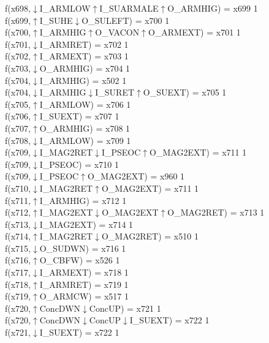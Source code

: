 f(x698,$\downarrow$I\_ARMLOW$\uparrow$I\_SUARMALE$\uparrow$O\_ARMHIG) = x699 {1} \\
f(x699,$\uparrow$I\_SUHE$\downarrow$O\_SULEFT) = x700 {1} \\
f(x700,$\uparrow$I\_ARMHIG$\uparrow$O\_VACON$\uparrow$O\_ARMEXT) = x701 {1} \\
f(x701,$\downarrow$I\_ARMRET) = x702 {1} \\
f(x702,$\uparrow$I\_ARMEXT) = x703 {1} \\
f(x703,$\downarrow$O\_ARMHIG) = x704 {1} \\
f(x704,$\downarrow$I\_ARMHIG) = x502 {1} \\
f(x704,$\downarrow$I\_ARMHIG$\downarrow$I\_SURET$\uparrow$O\_SUEXT) = x705 {1} \\
f(x705,$\uparrow$I\_ARMLOW) = x706 {1} \\
f(x706,$\uparrow$I\_SUEXT) = x707 {1} \\
f(x707,$\uparrow$O\_ARMHIG) = x708 {1} \\
f(x708,$\downarrow$I\_ARMLOW) = x709 {1} \\
f(x709,$\downarrow$I\_MAG2RET$\downarrow$I\_PSEOC$\uparrow$O\_MAG2EXT) = x711 {1} \\
f(x709,$\downarrow$I\_PSEOC) = x710 {1} \\
f(x709,$\downarrow$I\_PSEOC$\uparrow$O\_MAG2EXT) = x960 {1} \\
f(x710,$\downarrow$I\_MAG2RET$\uparrow$O\_MAG2EXT) = x711 {1} \\
f(x711,$\uparrow$I\_ARMHIG) = x712 {1} \\
f(x712,$\uparrow$I\_MAG2EXT$\downarrow$O\_MAG2EXT$\uparrow$O\_MAG2RET) = x713 {1} \\
f(x713,$\downarrow$I\_MAG2EXT) = x714 {1} \\
f(x714,$\uparrow$I\_MAG2RET$\downarrow$O\_MAG2RET) = x510 {1} \\
f(x715,$\downarrow$O\_SUDWN) = x716 {1} \\
f(x716,$\uparrow$O\_CBFW) = x526 {1} \\
f(x717,$\downarrow$I\_ARMEXT) = x718 {1} \\
f(x718,$\uparrow$I\_ARMRET) = x719 {1} \\
f(x719,$\uparrow$O\_ARMCW) = x517 {1} \\
f(x720,$\uparrow$ConcDWN$\downarrow$ConcUP) = x721 {1} \\
f(x720,$\uparrow$ConcDWN$\downarrow$ConcUP$\downarrow$I\_SUEXT) = x722 {1} \\
f(x721,$\downarrow$I\_SUEXT) = x722 {1} \\
